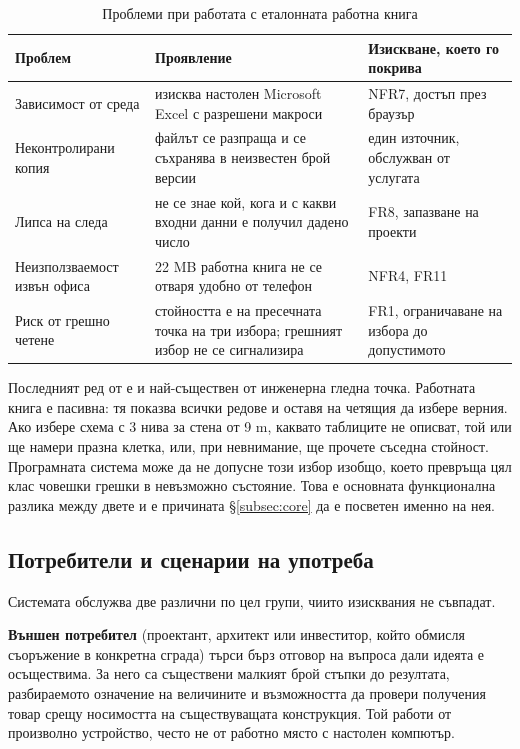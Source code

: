 \begin{table}[htbp]
\centering
\caption{Проблеми при работата с еталонната работна книга}
\label{tab:asis}
{\fontsize{10}{12}\selectfont
\begin{tabular}{@{}L{3.3cm}L{5.0cm}L{4.6cm}@{}}
\toprule
\textbf{Проблем} & \textbf{Проявление} & \textbf{Изискване, което го покрива} \\
\midrule
Зависимост от среда & изисква настолен Microsoft Excel с разрешени макроси & NFR7, достъп през браузър \\
Неконтролирани копия & файлът се разпраща и се съхранява в неизвестен брой версии & един източник, обслужван от услугата \\
Липса на следа & не се знае кой, кога и с какви входни данни е получил дадено число & FR8, запазване на проекти \\
Неизползваемост извън офиса & 22 MB работна книга не се отваря удобно от телефон & NFR4, FR11 \\
Риск от грешно четене & стойността е на пресечната точка на три избора; грешният избор не се сигнализира & FR1, ограничаване на избора до допустимото \\
\bottomrule
\end{tabular}}
\end{table}

Последният ред от  е и най-съществен от инженерна гледна точка.
Работната книга е пасивна: тя показва всички редове и оставя на четящия да избере
верния. Ако избере схема с 3 нива за стена от 9 m, каквато таблиците не описват, той
или ще намери празна клетка, или, при невнимание, ще прочете съседна стойност.
Програмната система може да не допусне този избор изобщо, което превръща цял клас
човешки грешки в невъзможно състояние. Това е основната функционална разлика между
двете и е причината §\ref{subsec:core} да е посветен именно на нея.

\subsection{Потребители и сценарии на употреба}
\label{subsec:users}

Системата обслужва две различни по цел групи, чиито изисквания не съвпадат.

\textbf{Външен потребител} (проектант, архитект или инвеститор, който обмисля
съоръжение в конкретна сграда) търси бърз отговор на въпроса дали идеята е
осъществима. За него са съществени малкият брой стъпки до резултата, разбираемото
означение на величините и възможността да провери получения товар срещу носимостта
на съществуващата конструкция. Той работи от произволно устройство, често не от
работно място с настолен компютър.

